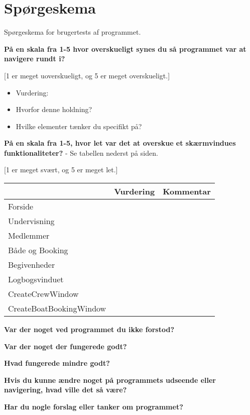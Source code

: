 \chapter{Spørgeskema}\label{bilag:SporgeSkema}
Spørgeskema for brugertests af programmet.

\textbf{På en skala fra 1-5 hvor overskueligt synes du så programmet var at navigere rundt i?}

[1 er meget uoverskueligt, og 5 er meget overskueligt.]

\begin{itemize}
\item Vurdering: 
\item Hvorfor denne holdning? 
\item Hvilke elementer tænker du specifikt på?
\end{itemize}

\textbf{På en skala fra 1-5, hvor let var det at overskue et skærmvindues funktionaliteter?} - Se tabellen nederst på siden.

[1 er meget svært, og 5 er meget let.]

\begin{table}\label{TabelVurdering}
    \begin{tabular}{l|l|l}
    ~                       & Vurdering & Kommentar \\ \hline
    Forside                 & ~         & ~         \\
    Undervisning            & ~         & ~         \\
    Medlemmer               & ~         & ~         \\
    Både og Booking         & ~         & ~         \\
    Begivenheder            & ~         & ~         \\
    Logbogsvinduet          & ~         & ~         \\
    CreateCrewWindow        & ~         & ~         \\
    CreateBoatBookingWindow & ~         & ~         \\
    \end{tabular}
\end{table}

\textbf{Var der noget ved programmet du ikke forstod?}

\textbf{Var der noget der fungerede godt?}



\textbf{Hvad fungerede mindre godt?}

\textbf{Hvis du kunne ændre noget på programmets udseende eller navigering, hvad ville det så være?}

\textbf{Har du nogle forslag eller tanker om programmet?}
